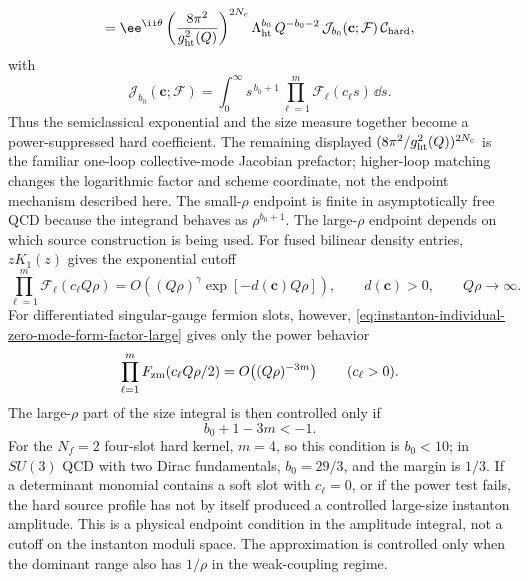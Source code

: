 \begin{controlledapproximation}
\begin{equation}
  =
  \ee^{\ii\theta}
  \left(\frac{8\pi^2}{g_{\rm ht}^2(Q)}\right)^{2N_c}
  \Lambda_{\rm ht}^{b_0}\,
  Q^{-b_0-2}\,
  \mathcal J_{b_0}(\mathbf c;\mathcal F)\,
  \mathcal C_{\rm hard},
  \label{eq:hard-momentum-instanton-rg-invariant-scaling}
\end{equation}
with
\[
  \mathcal J_{b_0}(\mathbf c;\mathcal F)
  =
  \int_0^\infty
  s^{\,b_0+1}
  \prod_{\ell=1}^{m}
  \mathcal F_\ell(c_\ell s)\,\dd s .
\]
Thus the semiclassical exponential and the size measure together become a
power-suppressed hard coefficient.  The remaining displayed
\((8\pi^2/g_{\rm ht}^2(Q))^{2N_c}\) is the familiar one-loop collective-mode
Jacobian prefactor; higher-loop matching changes the logarithmic factor and
scheme coordinate, not the endpoint mechanism described here.
The small-\(\rho\) endpoint is finite in asymptotically free QCD because the
integrand behaves as \(\rho^{b_0+1}\).  The large-\(\rho\) endpoint depends on
which source construction is being used.  For fused bilinear density entries,
\(zK_1(z)\) gives the exponential cutoff
\[
  \prod_{\ell=1}^{m}\mathcal F_\ell(c_\ell Q\rho)
  =
  O\!\left((Q\rho)^\gamma\exp[-d(\mathbf c)Q\rho]\right),
  \qquad d(\mathbf c)>0,
  \qquad Q\rho\to\infty .
\]
For differentiated singular-gauge fermion slots, however,
\eqref{eq:instanton-individual-zero-mode-form-factor-large} gives only the
power behavior
\[
  \prod_{\ell=1}^{m}F_{\rm zm}(c_\ell Q\rho/2)
  =
  O\!\left((Q\rho)^{-3m}\right)
  \qquad(c_\ell>0).
\]
The large-\(\rho\) part of the size integral is then controlled only if
\begin{equation}
  b_0+1-3m<-1 .
  \label{eq:hard-momentum-individual-slot-large-rho-test}
\end{equation}
For the \(N_f=2\) four-slot hard kernel, \(m=4\), so this condition is
\(b_0<10\); in \(SU(3)\) QCD with two Dirac fundamentals,
\(b_0=29/3\), and the margin is \(1/3\).  If a determinant monomial contains a
soft slot with \(c_\ell=0\), or if the power test fails, the hard source
profile has not by itself produced a controlled large-size instanton
amplitude.  This is a physical endpoint condition in the amplitude integral,
not a cutoff on the instanton moduli space.  The approximation is controlled
only when the dominant range also has \(1/\rho\) in the weak-coupling regime.
\end{controlledapproximation}

